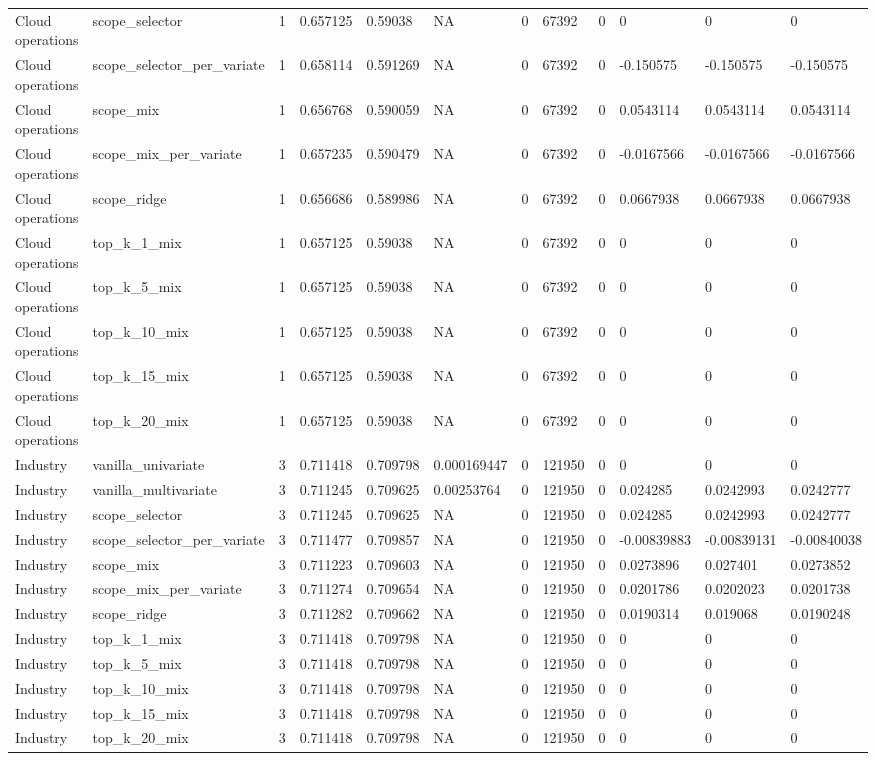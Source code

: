 \begin{tabular}{llllllllllll}
Cloud operations & scope\_selector & 1 & 0.657125 & 0.59038 & NA & 0 & 67392 & 0 & 0 & 0 & 0 \\
Cloud operations & scope\_selector\_per\_variate & 1 & 0.658114 & 0.591269 & NA & 0 & 67392 & 0 & -0.150575 & -0.150575 & -0.150575 \\
Cloud operations & scope\_mix & 1 & 0.656768 & 0.590059 & NA & 0 & 67392 & 0 & 0.0543114 & 0.0543114 & 0.0543114 \\
Cloud operations & scope\_mix\_per\_variate & 1 & 0.657235 & 0.590479 & NA & 0 & 67392 & 0 & -0.0167566 & -0.0167566 & -0.0167566 \\
Cloud operations & scope\_ridge & 1 & 0.656686 & 0.589986 & NA & 0 & 67392 & 0 & 0.0667938 & 0.0667938 & 0.0667938 \\
Cloud operations & top\_k\_1\_mix & 1 & 0.657125 & 0.59038 & NA & 0 & 67392 & 0 & 0 & 0 & 0 \\
Cloud operations & top\_k\_5\_mix & 1 & 0.657125 & 0.59038 & NA & 0 & 67392 & 0 & 0 & 0 & 0 \\
Cloud operations & top\_k\_10\_mix & 1 & 0.657125 & 0.59038 & NA & 0 & 67392 & 0 & 0 & 0 & 0 \\
Cloud operations & top\_k\_15\_mix & 1 & 0.657125 & 0.59038 & NA & 0 & 67392 & 0 & 0 & 0 & 0 \\
Cloud operations & top\_k\_20\_mix & 1 & 0.657125 & 0.59038 & NA & 0 & 67392 & 0 & 0 & 0 & 0 \\
Industry & vanilla\_univariate & 3 & 0.711418 & 0.709798 & 0.000169447 & 0 & 121950 & 0 & 0 & 0 & 0 \\
Industry & vanilla\_multivariate & 3 & 0.711245 & 0.709625 & 0.00253764 & 0 & 121950 & 0 & 0.024285 & 0.0242993 & 0.0242777 \\
Industry & scope\_selector & 3 & 0.711245 & 0.709625 & NA & 0 & 121950 & 0 & 0.024285 & 0.0242993 & 0.0242777 \\
Industry & scope\_selector\_per\_variate & 3 & 0.711477 & 0.709857 & NA & 0 & 121950 & 0 & -0.00839883 & -0.00839131 & -0.00840038 \\
Industry & scope\_mix & 3 & 0.711223 & 0.709603 & NA & 0 & 121950 & 0 & 0.0273896 & 0.027401 & 0.0273852 \\
Industry & scope\_mix\_per\_variate & 3 & 0.711274 & 0.709654 & NA & 0 & 121950 & 0 & 0.0201786 & 0.0202023 & 0.0201738 \\
Industry & scope\_ridge & 3 & 0.711282 & 0.709662 & NA & 0 & 121950 & 0 & 0.0190314 & 0.019068 & 0.0190248 \\
Industry & top\_k\_1\_mix & 3 & 0.711418 & 0.709798 & NA & 0 & 121950 & 0 & 0 & 0 & 0 \\
Industry & top\_k\_5\_mix & 3 & 0.711418 & 0.709798 & NA & 0 & 121950 & 0 & 0 & 0 & 0 \\
Industry & top\_k\_10\_mix & 3 & 0.711418 & 0.709798 & NA & 0 & 121950 & 0 & 0 & 0 & 0 \\
Industry & top\_k\_15\_mix & 3 & 0.711418 & 0.709798 & NA & 0 & 121950 & 0 & 0 & 0 & 0 \\
Industry & top\_k\_20\_mix & 3 & 0.711418 & 0.709798 & NA & 0 & 121950 & 0 & 0 & 0 & 0 \\
\bottomrule
\end{tabular}
